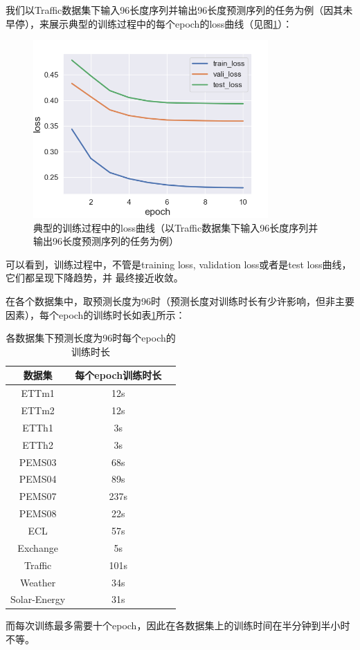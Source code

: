 \documentclass[twoside,12pt]{article}
\begin{document}
我们以Traffic数据集下输入96长度序列并输出96长度预测序列的任务为例（因其未早停），来展示典型的训练过程中的每个epoch的loss曲线（见图\ref{fig:loss}）：
\begin{figure}[htbp]
  \centering
  \includegraphics[width=0.8\textwidth]{./pic/loss_plot.png}
  \caption{典型的训练过程中的loss曲线（以Traffic数据集下输入96长度序列并输出96长度预测序列的任务为例）}
  \label{fig:loss}
\end{figure}

可以看到，训练过程中，不管是training loss, validation loss或者是test loss曲线，它们都呈现下降趋势，并 最终接近收敛。

在各个数据集中，取预测长度为96时（预测长度对训练时长有少许影响，但非主要因素），每个epoch的训练时长如表\ref{tab:time}所示：
\begin{table}[htbp]
  \caption{各数据集下预测长度为96时每个epoch的训练时长}
  \label{tab:time}
  \vspace{5pt}
  \centering
  \begin{tabular}{ccc}
    \toprule
    数据集       & 每个epoch训练时长 \\
    \midrule
    ETTm1        & 12s               \\
    ETTm2        & 12s               \\
    ETTh1        & 3s                \\
    ETTh2        & 3s                \\
    PEMS03       & 68s               \\
    PEMS04       & 89s               \\
    PEMS07       & 237s              \\
    PEMS08       & 22s               \\
    ECL          & 57s               \\
    Exchange     & 5s                \\
    Traffic      & 101s              \\
    Weather      & 34s               \\
    Solar-Energy & 31s               \\
    \bottomrule
  \end{tabular}
\end{table}
而每次训练最多需要十个epoch，因此在各数据集上的训练时间在半分钟到半小时不等。
\end{document}
